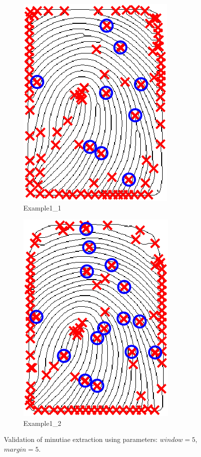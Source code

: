 \documentclass[a4paper]{article}
\begin{document}
\begin{figure}[H]
  \centering
       \begin{subfigure}[t]{0.45\textwidth}
         \centering
         \includegraphics[scale=0.7]{Figures/Validation1-5-5}
         \caption{Example1\_1}
     \end{subfigure}%
     \quad
     \begin{subfigure}[t]{0.45\textwidth}
         \centering
         \includegraphics[scale=0.7]{Figures/Validation2-5-5}
         \caption{Example1\_2}
     \end{subfigure}
    \caption{Validation of minutiae extraction using parameters: \(window = 5\), \(margin=5\).}
    \label{fig:ex6a}
\end{figure}
\end{document}
